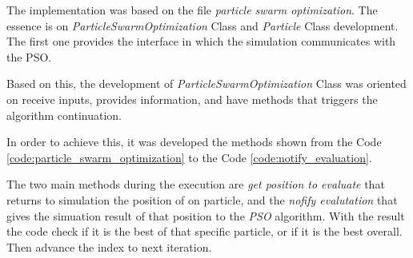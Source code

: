 The implementation was based on the file \textit{particle swarm optimization}. The essence is on \textit{ParticleSwarmOptimization} Class and \textit{Particle} Class development. The first one provides the interface in which the simulation communicates with the PSO.

Based on this, the development of \textit{ParticleSwarmOptimization} Class was oriented on receive inputs, provides information, and have methods that triggers the algorithm continuation.

In order to achieve this, it was developed the methods shown from the Code \ref{code:particle_swarm_optimization} to the Code \ref{code:notify_evaluation}.













The two main methods during the execution are \textit{get position to evaluate} that returns to simulation the position of on particle, and the \textit{nofify evalutation} that gives the simuation result of that position to the \textit{PSO} algorithm. With the result the code check if it is the best of that specific particle, or if it is the best overall. Then advance the index to next iteration.

